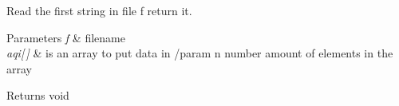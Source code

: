 Read the first string in file f return it.


\begin{DoxyParams}{Parameters}
{\em f} & filename \\
\hline
{\em aqi\mbox{[}$\,$\mbox{]}} & is an array to put data in /param n number amount of elements in the array \\
\hline
\end{DoxyParams}
\begin{DoxyReturn}{Returns}
void 
\end{DoxyReturn}
